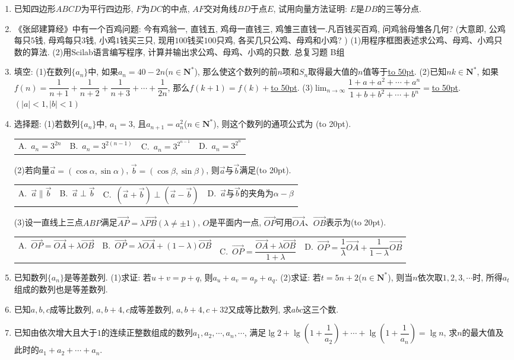\documentclass[10pt,a4paper]{article}
\newcommand{\blank}[1]{\underline{\hbox to #1pt{}}}
\newcommand{\bracket}[1]{(\hbox to #1pt{})}
\newcommand{\fourch}[4]{\par\begin{tabular}{p{.23\textwidth}p{.23\textwidth}p{.23\textwidth}p{.23\textwidth}}
A.~#1 &B.~#2& C.~#3& D.~#4
\end{tabular}}
\begin{document}
\begin{enumerate}[1.]
\item 已知四边形$ABCD$为平行四边形, $F$为$DC$的中点, $AF$交对角线$BD$于点$E$, 试用向量方法证明: $E$是$DB$的三等分点.
\item 《张邱建算经》中有一个百鸡问题: 今有鸡翁一, 直钱五, 鸡母一直钱三, 鸡雏三直钱一.凡百钱买百鸡, 问鸡翁母雏各几何? (大意即, 公鸡每只$5$钱, 母鸡每只$3$钱, 小鸡$1$钱买三只, 现用$100$钱买$100$只鸡, 各买几只公鸡、母鸡和小鸡? )
(1)用程序框图表述求公鸡、母鸡、小鸡只数的算法.
(2)用Scilab语言编写程序, 计算并输出求公鸡、母鸡、小鸡的只数.
总复习题
B组
\item 填空:
(1)在数列$\{a_n\}$中, 如果$a_n=40-2n$($n\in \mathbf{N}^*$), 那么使这个数列的前$n$项和$S_n$取得最大值的$n$值等于\blank{50}.
(2)已知$nk\in \mathbf{N}^*$, 如果$f(n)=\dfrac 1{n+1}+\dfrac 1{n+2}+\dfrac 1{n+3}+\cdots +\dfrac 1{2n}$, 那么$f(k+1)=f(k)+$\blank{50}.
(3)$\displaystyle\lim_{n\to\infty}\dfrac{1+a+a^2+\cdots +a^n}{1+b+b^2+\cdots +b^n}=$\blank{50}.$(|a|<1,|b|<1)$
\item 选择题:
(1)若数列$\{a_n\}$中, $a_1=3$, 且$a_{n+1}=a_n^2$($n\in \mathbf{N}^*$), 则这个数列的通项公式为    \bracket{20}.
\fourch{$a_n=3^{2n}$}{$a_n=3^{2(n-1)}$}{$a_n=3^{2^{n-1}}$}{$a_n=3^{2^n}$}
(2)若向量$\overrightarrow a=(\cos \alpha ,\sin \alpha)$, $\overrightarrow b=(\cos \beta ,\sin \beta)$, 则$\overrightarrow a$与$\overrightarrow b$满足\bracket{20}.
\fourch{$\overrightarrow a\parallel \overrightarrow b$}{$\overrightarrow a\perp \overrightarrow b$}{$(\overrightarrow a+\overrightarrow b)\perp (\overrightarrow a-\overrightarrow b)$}{$\overrightarrow a$与$\overrightarrow b$的夹角为$\alpha -\beta$}
(3)设一直线上三点$ABP$满足$\overrightarrow{AP}=\lambda \overrightarrow{PB}(\lambda \ne \pm 1)$, $O$是平面内一点, $\overrightarrow{OP}$可用$\overrightarrow{OA}$、$\overrightarrow{OB}$表示为\bracket{20}.
\fourch{$\overrightarrow{OP}=\overrightarrow{OA}+\lambda \overrightarrow{OB}$}{$\overrightarrow{OP}=\lambda \overrightarrow{OA}+(1-\lambda)\overrightarrow{OB}$}{$\overrightarrow{OP}=\dfrac{\overrightarrow{OA}+\lambda \overrightarrow{OB}}{1+\lambda }$}{$\overrightarrow{OP}=\dfrac 1{\lambda }\overrightarrow{OA}+\dfrac 1{1-\lambda }\overrightarrow{OB}$}
\item 已知数列$\{a_n\}$是等差数列.
(1)求证: 若$u+v=p+q$, 则$a_u+a_v=a_p+a_q$.
(2)求证: 若$t=5n+2$($n\in \mathbf{N}^*$), 则当$n$依次取$1, 2, 3, \cdots$时, 所得$a_t$组成的数列也是等差数列.
\item 已知$a,b,c$成等比数列, $a,b+4,c$成等差数列, $a,b+4,c+32$又成等比数列, 求$abc$这三个数.
\item 已知由依次增大且大于$1$的连续正整数组成的数列$a_1,a_2,\cdots ,a_n,\cdots$, 满足$\lg 2+\lg (1+\dfrac 1{a_2})+\cdots +\lg (1+\dfrac 1{a_n})=\lg n$, 求$n$的最大值及此时的$a_1+a_2+\cdots +a_n$.

\end{enumerate}
\end{document}
